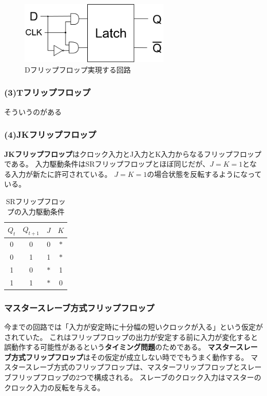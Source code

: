 \documentclass[a4j,10pt,oneside,openany,fleqn]{jsbook}
\begin{document}
\begin{figure}[h]
  \centering\includegraphics[height=3cm]{Images/DFlipflop.png}
  \caption{Dフリップフロップ実現する回路}
\end{figure}

\subsubsection{(3)Tフリップフロップ}
そういうのがある

\subsubsection{(4)JKフリップフロップ}
\textbf{JKフリップフロップ}はクロック入力とJ入力とK入力からなるフリップフロップである。
入力駆動条件はSRフリップフロップとほぼ同じだが、$J=K=1$となる入力が新たに許可されている。
$J=K=1$の場合状態を反転するようになっている。
\begin{table}[htb]
  \begin{center}
    \begin{tabular}{cc|cc} 
      $Q_t$ & $Q_{t+1}$ & $J$ & $K$ \\ \hline 
      0 & 0 & 0 & $\ast$ \\
      0 & 1 & 1 & $\ast$ \\
      1 & 0 & $\ast$ & 1 \\
      1 & 1 & $\ast$ & 0 \\
    \end{tabular}
  \end{center}
  \caption{SRフリップフロップの入力駆動条件}
\end{table}


\subsubsection{マスタースレーブ方式フリップフロップ}
今までの回路では「入力が安定時に十分幅の短いクロックが入る」という仮定がされていた。
これはフリップフロップの出力が安定する前に入力が変化すると誤動作する可能性があるという\textbf{タイミング問題}のためである。
\textbf{マスタースレーブ方式フリップフロップ}はその仮定が成立しない時ででもうまく動作する。
マスタースレーブ方式のフリップフロップは、マスターフリップフロップとスレーブフリップフロップの2つで構成される。
スレーブのクロック入力はマスターのクロック入力の反転を与える。
\end{document}
